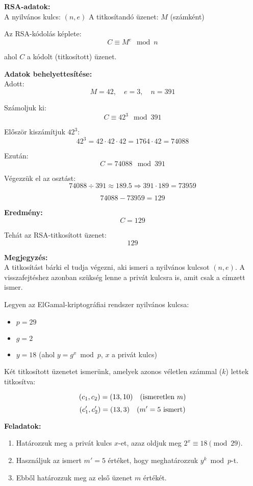 \begin{solution}

\textbf{RSA-adatok:}\\

A nyilvános kulcs: $(n,e)$ A titkosítandó üzenet: $M$ (számként)

Az RSA-kódolás képlete: 
\[
C\equiv M^{e}\mod n
\]

ahol $C$ a kódolt (titkosított) üzenet.

\textbf{Adatok behelyettesítése:}\\

Adott: 
\[
M=42,\quad e=3,\quad n=391
\]

Számoljuk ki: 
\[
C\equiv42^{3}\mod 391
\]

Először kiszámítjuk $42^{3}$: 
\[
42^{3}=42\cdot42\cdot42=1764\cdot42=74088
\]

Ezután: 
\[
C=74088\mod 391
\]

Végezzük el az osztást: 
\[
74088\div391\approx189.5\Rightarrow391\cdot189=73959
\]

\[
74088-73959=\boxed{129}
\]


\textbf{Eredmény:}\\

\[
\boxed{C=129}
\]

Tehát az RSA-titkosított üzenet: 
\[
\boxed{\text{129}}
\]


\textbf{Megjegyzés:}\\

A titkosítást bárki el tudja végezni, aki ismeri a nyilvános kulcsot
$(n,e)$. A visszafejtéshez azonban szükség lenne a privát kulcsra
is, amit csak a címzett ismer.
\end{solution}
\begin{extraproblem}


Legyen az ElGamal-kriptográfiai rendszer nyilvános kulcsa:
\begin{itemize}
\item $p=29$ 
\item $g=2$ 
\item $y=18$ \quad{}(ahol $y=g^{x}\bmod p$, $x$ a privát kulcs) 
\end{itemize}
Két titkosított üzenetet ismerünk, amelyek azonos véletlen számmal
($k$) lettek titkosítva:

\[
(c_{1},c_{2})=(13,10)\quad\text{(ismeretlen \ensuremath{m})}
\]
\[
(c_{1}',c_{2}')=(13,3)\quad\text{(\ensuremath{m'=5} ismert)}
\]

\textbf{Feladatok:} 
\begin{enumerate}
\item Határozzuk meg a privát kulcs $x$-et, azaz oldjuk meg $2^{x}\equiv18\pmod{29}$. 
\item Használjuk az ismert $m'=5$ értéket, hogy meghatározzuk $y^{k}\bmod p$-t. 
\item Ebből határozzuk meg az első üzenet $m$ értékét. 
\end{enumerate}
\end{extraproblem}
